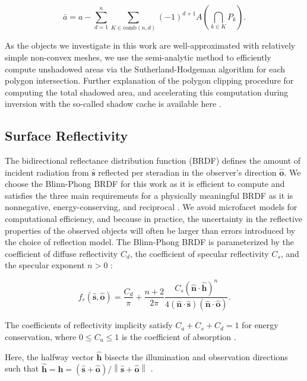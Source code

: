 \documentclass[a4paper,twocolumn]{spaceDebrisC} %
\newcommand{\vctr}[1]{\bm{#1}}
\newcommand{\unitv}[1]{\hat{\vctr{#1}}}
\newcommand{\norm}[1]{\left\lVert#1\right\rVert}
\begin{document}
\begin{equation} \label{eq:us_area}
 \bar{a} = a - \sum_{d=1}^{n} \sum_{K \in \text{comb}(n,d)} (-1)^{d+1} A\left(\bigcap\limits_{k \in K} P_k\right).
\end{equation}

As the objects we investigate in this work are well-approximated with relatively simple non-convex meshes, we use the semi-analytic method to efficiently compute unshadowed areas via the Sutherland-Hodgeman algorithm \cite{sutherland1974} for each polygon intersection. Further explanation of the polygon clipping procedure for computing the total shadowed area, and accelerating this computation during inversion with the so-called shadow cache is available here \cite{robinson2025att}.

\subsection{Surface Reflectivity}

The bidirectional reflectance distribution function (BRDF) defines the amount of incident radiation from $\unitv{s}$ reflected per steradian in the observer's direction $\unitv{o}$. We choose the Blinn-Phong \cite{blinn1977} BRDF for this work as it is efficient to compute and satisfies the three main requirements for a physically meaningful BRDF as it is nonnegative, energy-conserving, and reciprocal \cite{duvenhage2013}. We avoid microfacet models for computational efficiency, and because in practice, the uncertainty in the reflective properties of the observed objects will often be larger than errors introduced by the choice of reflection model. The Blinn-Phong BRDF is parameterized by the coefficient of diffuse reflectivity $C_d$, the coefficient of specular reflectivity $C_s$, and the specular exponent $n>0$ \cite{duvenhage2013}:

\begin{equation} \label{eq:brdf_blinn_phong}
 f_r(\unitv{s}, \unitv{o}) = \frac{C_d}{\pi} + \frac{n+2}{2\pi} \frac{C_s (\unitv{n} \cdot \unitv{h})^n}{4 (\unitv{n} \cdot \unitv{s})(\unitv{n} \cdot \unitv{o})}.
\end{equation}

The coefficients of reflectivity implicity satisfy $C_a + C_s + C_d = 1$ for energy conservation, where $ 0 \leq C_a \leq 1$ is the coefficient of absorption \cite{fan2020thesis}.

Here, the halfway vector $\unitv{h}$ bisects the illumination and observation directions such that $\unitv{h} = \unitv{h} = (\unitv{s} + \unitv{o})/\norm{\unitv{s} + \unitv{o}}$ \cite{duvenhage2013}.
\end{document}
